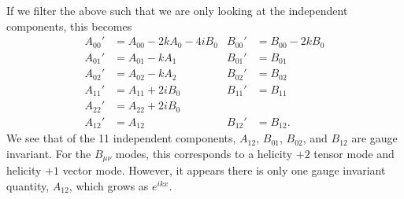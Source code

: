 \documentclass[10pt,letterpaper]{article}
\begin{document}
If we filter the above such that we are only looking at the independent components, this becomes
\begin{align}
A_{00}' &= A_{00} -2kA_0 - 4i B_0 			& B_{00}'&= B_{00} -2k B_0
\nonumber\\
A_{01}' &= A_{01} - kA_1							& B_{01}'&= B_{01} 
\nonumber\\
A_{02}' &= A_{02} - kA_2							&B_{02}'&= B_{02}
\nonumber \\
A_{11}' &= A_{11} + 2i B_0						&B_{11}'&= B_{11}
\nonumber\\
A_{22}' & = A_{22} +2iB_0						&&
\nonumber\\
A_{12}' &= A_{12}									&B_{12}'&=B_{12}.
\end{align}
We see that of the 11 independent components, $A_{12}$, $B_{01}$, $B_{02}$, and $B_{12}$ are gauge invariant. For the $B_{\mu\nu}$ modes, this corresponds to a helicity $+2$ tensor mode and helicity $+1$ vector mode. However, it appears there is only one gauge invariant quantity, $A_{12}$, which grows as $e^{ikx}$. 
\end{document}

